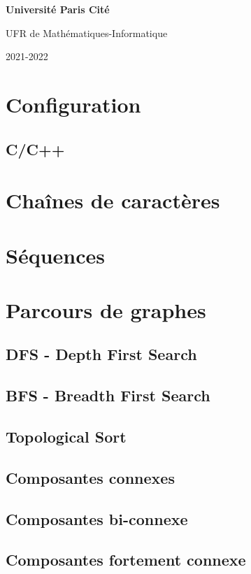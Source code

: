 \documentclass[8pt]{article}
\begin{document}
\begin{titlepage}
\begin{center}
        \textbf{Université Paris Cité}

        UFR de Mathématiques-Informatique

        2021-2022

    \end{center}
\end{titlepage}
    \section{Configuration}
        \subsection{C/C++}
    \section{Chaînes de caractères}
    \section{Séquences}
    \section{Parcours de graphes}
        \subsection{DFS - Depth First Search}
        {\scriptsize}
        \subsection{BFS - Breadth First Search}
        {\scriptsize}
        \subsection{Topological Sort}
        \subsection{Composantes connexes}
        \subsection{Composantes bi-connexe}
        \subsection{Composantes fortement connexe}
\end{document}
